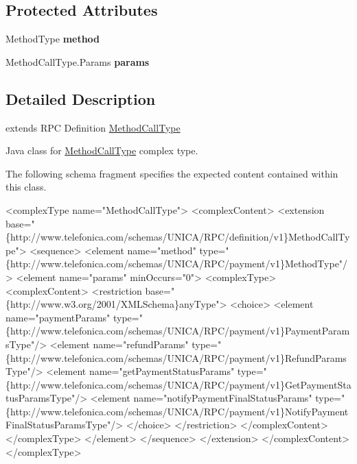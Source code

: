 \subsection*{Protected Attributes}
\begin{DoxyCompactItemize}
\item 
\hypertarget{classcom_1_1telefonica_1_1schemas_1_1unica_1_1rpc_1_1payment_1_1v1_1_1MethodCallType_a5c47c028b342693e9e5853c1d6d6e02e}{
MethodType {\bfseries method}}
\label{classcom_1_1telefonica_1_1schemas_1_1unica_1_1rpc_1_1payment_1_1v1_1_1MethodCallType_a5c47c028b342693e9e5853c1d6d6e02e}

\item 
\hypertarget{classcom_1_1telefonica_1_1schemas_1_1unica_1_1rpc_1_1payment_1_1v1_1_1MethodCallType_a168dc83e0d3577b45e66765c333119e8}{
MethodCallType.Params {\bfseries params}}
\label{classcom_1_1telefonica_1_1schemas_1_1unica_1_1rpc_1_1payment_1_1v1_1_1MethodCallType_a168dc83e0d3577b45e66765c333119e8}

\end{DoxyCompactItemize}


\subsection{Detailed Description}
extends RPC Definition \hyperlink{classcom_1_1telefonica_1_1schemas_1_1unica_1_1rpc_1_1payment_1_1v1_1_1MethodCallType}{MethodCallType}

Java class for \hyperlink{classcom_1_1telefonica_1_1schemas_1_1unica_1_1rpc_1_1payment_1_1v1_1_1MethodCallType}{MethodCallType} complex type.

The following schema fragment specifies the expected content contained within this class.


\begin{DoxyPre}
 <complexType name="MethodCallType">
   <complexContent>
     <extension base="\{http://www.telefonica.com/schemas/UNICA/RPC/definition/v1\}MethodCallType">
       <sequence>
         <element name="method" type="\{http://www.telefonica.com/schemas/UNICA/RPC/payment/v1\}MethodType"/>
         <element name="params" minOccurs="0">
           <complexType>
             <complexContent>
               <restriction base="\{http://www.w3.org/2001/XMLSchema\}anyType">
                 <choice>
                   <element name="paymentParams" type="\{http://www.telefonica.com/schemas/UNICA/RPC/payment/v1\}PaymentParamsType"/>
                   <element name="refundParams" type="\{http://www.telefonica.com/schemas/UNICA/RPC/payment/v1\}RefundParamsType"/>
                   <element name="getPaymentStatusParams" type="\{http://www.telefonica.com/schemas/UNICA/RPC/payment/v1\}GetPaymentStatusParamsType"/>
                   <element name="notifyPaymentFinalStatusParams" type="\{http://www.telefonica.com/schemas/UNICA/RPC/payment/v1\}NotifyPaymentFinalStatusParamsType"/>
                 </choice>
               </restriction>
             </complexContent>
           </complexType>
         </element>
       </sequence>
     </extension>
   </complexContent>
 </complexType>
 \end{DoxyPre}
 

